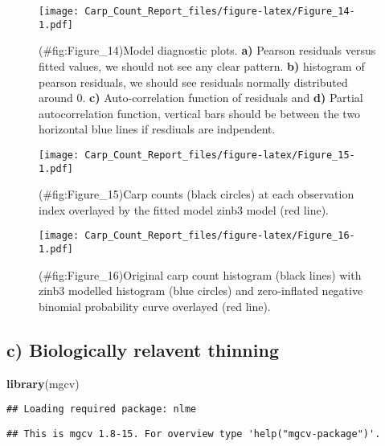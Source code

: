 \documentclass[]{article}
\newenvironment{Shaded}{\begin{snugshade}}{\end{snugshade}}
\newcommand{\KeywordTok}[1]{\textcolor[rgb]{0.13,0.29,0.53}{\textbf{{#1}}}}
\newcommand{\NormalTok}[1]{{#1}}
\begin{document}
\begin{figure}[htbp]
\centering
\texttt{[image: Carp\_Count\_Report\_files/figure-latex/Figure\_14-1.pdf]}
\caption{(\#fig:Figure\_14)Model diagnostic plots. \textbf{a)} Pearson
residuals versus fitted values, we should not see any clear pattern.
\textbf{b)} histogram of pearson residuals, we should see residuals
normally distributed around 0. \textbf{c)} Auto-correlation function of
residuals and \textbf{d)} Partial autocorrelation function, vertical
bars should be between the two horizontal blue lines if resdiuals are
indpendent.}
\end{figure}

\begin{figure}[htbp]
\centering
\texttt{[image: Carp\_Count\_Report\_files/figure-latex/Figure\_15-1.pdf]}
\caption{(\#fig:Figure\_15)Carp counts (black circles) at each
observation index overlayed by the fitted model zinb3 model (red line).}
\end{figure}

\begin{figure}[htbp]
\centering
\texttt{[image: Carp\_Count\_Report\_files/figure-latex/Figure\_16-1.pdf]}
\caption{(\#fig:Figure\_16)Original carp count histogram (black lines)
with zinb3 modelled histogram (blue circles) and zero-inflated negative
binomial probability curve overlayed (red line).}
\end{figure}

\subsection{c) Biologically relavent
thinning}\label{c-biologically-relavent-thinning}

\begin{Shaded}
\begin{Highlighting}[]
\KeywordTok{library}\NormalTok{(mgcv)}
\end{Highlighting}
\end{Shaded}

\begin{verbatim}
## Loading required package: nlme
\end{verbatim}

\begin{verbatim}
## This is mgcv 1.8-15. For overview type 'help("mgcv-package")'.
\end{verbatim}
\end{document}
